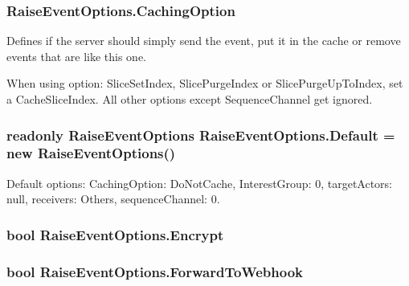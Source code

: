\subsubsection[{\texorpdfstring{Caching\+Option}{CachingOption}}]{ Raise\+Event\+Options.\+Caching\+Option}\hypertarget{class_raise_event_options_a4f5d60401abe2561ab71c9ff9290c06b}{}\label{class_raise_event_options_a4f5d60401abe2561ab71c9ff9290c06b}


Defines if the server should simply send the event, put it in the cache or remove events that are like this one. 

When using option\+: Slice\+Set\+Index, Slice\+Purge\+Index or Slice\+Purge\+Up\+To\+Index, set a Cache\+Slice\+Index. All other options except Sequence\+Channel get ignored. 
\subsubsection[{\texorpdfstring{Default}{Default}}]{\setlength{\rightskip}{0pt plus 5cm}readonly {\bf Raise\+Event\+Options} Raise\+Event\+Options.\+Default = new {\bf Raise\+Event\+Options}()\hspace{0.3cm}{\ttfamily [static]}}\hypertarget{class_raise_event_options_af1fcb68ddd5f76876c8448de8b5ecb4d}{}\label{class_raise_event_options_af1fcb68ddd5f76876c8448de8b5ecb4d}


Default options\+: Caching\+Option\+: Do\+Not\+Cache, Interest\+Group\+: 0, target\+Actors\+: null, receivers\+: Others, sequence\+Channel\+: 0.

\subsubsection[{\texorpdfstring{Encrypt}{Encrypt}}]{\setlength{\rightskip}{0pt plus 5cm}bool Raise\+Event\+Options.\+Encrypt}\hypertarget{class_raise_event_options_aceba8258488a041c9b52df3bf485830c}{}\label{class_raise_event_options_aceba8258488a041c9b52df3bf485830c}
\subsubsection[{\texorpdfstring{Forward\+To\+Webhook}{ForwardToWebhook}}]{\setlength{\rightskip}{0pt plus 5cm}bool Raise\+Event\+Options.\+Forward\+To\+Webhook}\hypertarget{class_raise_event_options_a389e7e5b0df4ce93ba2731a51abc560b}{}\label{class_raise_event_options_a389e7e5b0df4ce93ba2731a51abc560b}


